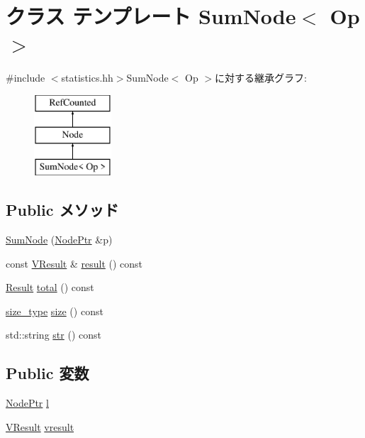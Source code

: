 \hypertarget{classStats_1_1SumNode}{
\section{クラス テンプレート SumNode$<$ Op $>$}
\label{classStats_1_1SumNode}
}


{\ttfamily \#include $<$statistics.hh$>$}SumNode$<$ Op $>$に対する継承グラフ:\begin{figure}[H]
\begin{center}
\leavevmode
\includegraphics[height=3cm]{classStats_1_1SumNode}
\end{center}
\end{figure}
\subsection*{Public メソッド}
\begin{DoxyCompactItemize}
\item 
\hyperlink{classStats_1_1SumNode_addf050808d112444523fdc74f5f77f5d}{SumNode} (\hyperlink{classRefCountingPtr}{NodePtr} \&p)
\item 
const \hyperlink{classstd_1_1vector}{VResult} \& \hyperlink{classStats_1_1SumNode_aba312f9e3431b1652f8b3ddf3fe105dc}{result} () const 
\item 
\hyperlink{namespaceStats_ad874d2cfd4b4a29ebd480bb2e67f20ae}{Result} \hyperlink{classStats_1_1SumNode_a35c6e2ed3fc81b40d69052a062113ead}{total} () const 
\item 
\hyperlink{namespaceStats_ada51e68d31936547d3729c82daf6b7c6}{size\_\-type} \hyperlink{classStats_1_1SumNode_a503ab01f6c0142145d3434f6924714e7}{size} () const 
\item 
std::string \hyperlink{classStats_1_1SumNode_a1b9b8885b0880fc4ddf9a2c7d1ca3dc4}{str} () const 
\end{DoxyCompactItemize}
\subsection*{Public 変数}
\begin{DoxyCompactItemize}
\item 
\hyperlink{classRefCountingPtr}{NodePtr} \hyperlink{classStats_1_1SumNode_a6ad7f056f60bd5cfec2caa5d5f4e363f}{l}
\item 
\hyperlink{classstd_1_1vector}{VResult} \hyperlink{classStats_1_1SumNode_a8f41af856442757ec68f3391333d3eb2}{vresult}
\end{DoxyCompactItemize}
